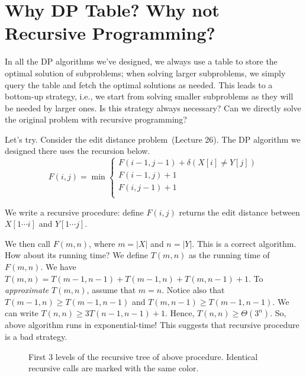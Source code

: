 \section{Why DP Table? Why not Recursive Programming?}

In all the DP algorithms we've designed, we always use a table to store
the optimal solution of subproblems; when solving larger
subproblems, we simply query the table and fetch the optimal
solutions as needed. 
This leads to a bottom-up strategy, i.e., we start from solving
smaller subproblems as they will be needed by larger ones.
Is this strategy always necessary?
Can we directly solve the original problem with recursive programming?

Let's try.
Consider the edit distance problem~(Lecture 26).
The DP algorithm we designed there uses the recursion below.
\begin{displaymath}
F(i,j) = \min\left\{
	\begin{array}{llll}
	F(i-1,j-1) + \delta(X[i] \neq Y[j]) \\
	F(i-1,j) + 1 \\
	F(i,j-1) + 1 \\
	\end{array}
\right.
\end{displaymath}

We write a recursive procedure: define $F(i,j)$
returns the edit distance between $X[1\cdots i]$ and $Y[1\cdots j]$.

\begin{minipage}{0.8\textwidth}
	\xxx
	\xxx
	\xxx
	\xxx
	\xxx
	\xxx
	\xxx
	\xxx
\end{minipage}

We then call $F(m,n)$, where $m=|X|$ and $n=|Y|$.
This is a correct algorithm.
How about its running time?
We define $T(m,n)$ as the running time of $F(m,n)$.
We have $T(m,n) = T(m-1,n-1) + T(m-1,n) + T(m,n-1) + 1$.
To \emph{approximate} $T(m,n)$, assume that $m=n$.
Notice also that $T(m-1,n) \ge T(m-1,n-1)$
and $T(m,n-1) \ge T(m-1,n-1)$.
We can write $T(n,n) \ge 3T(n-1,n-1) + 1$.
Hence, $T(n,n) \ge \Theta(3^n)$.
So, above algorithm runs in exponential-time!
This suggests that recursive procedure is a bad strategy.

\begin{figure}[b]
\centering{}
\caption{First 3 levels of the recursive tree of above procedure.
Identical recursive calls are marked with the same color.}
\label{fig:tree}
\end{figure}


